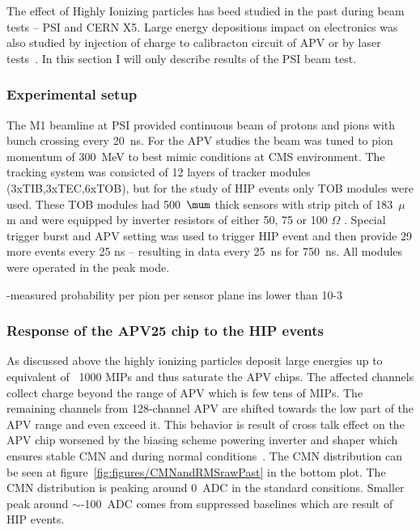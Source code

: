 The effect of Highly Ionizing particles has beed studied in the past during beam tests -- PSI and CERN X5. Large energy depositions impact on electronics was also studied by injection of charge to calibracton circuit of APV or by laser tests~\cite{Adam:2005pz}. In this section I will only describe results of the PSI beam test.

\subsubsection{Experimental setup}

The M1 beamline at PSI provided continuous beam of protons and pions with bunch crossing every 20~ns. For the APV studies the beam was tuned to pion momentum of 300~MeV to best mimic conditions at CMS environment. The tracking system was consicted of 12 layers of tracker modules (3xTIB,3xTEC,6xTOB), but for the study of HIP events only TOB modules were used. These TOB modules had 500~$\mum$ thick sensors with strip pitch of 183~$\mu$m and were equipped by inverter resistors of either 50, 75 or 100 $\Omega$ . Special trigger burst and APV setting was used to trigger HIP event and then provide 29 more events every 25 ns -- resulting in data every 25~ns for 750~ns. All modules were operated in the peak mode. 


-measured probability per pion per sensor plane ins lower than 10-3


\subsubsection{Response of the APV25 chip to the HIP events}

As discussed above the highly ionizing particles deposit large energies up to equivalent of ~1000 MIPs and thus saturate the APV chips. The affected channels collect charge beyond the range of APV which is few tens of MIPs. The remaining channels from 128-channel APV are shifted towards the low part of the APV range and even exceed it. This behavior is result of cross talk effect on the APV chip worsened by the biasing scheme powering inverter and shaper which ensures stable CMN and during normal conditions~\cite{Bainbridge:2004jc}. The CMN distribution can be seen at figure~\ref{fig:figures/CMNandRMSrawPast} in the bottom plot. The CMN distribution is peaking around 0~ADC in the standard consitions. Smaller peak around $\sim$-100~ADC comes from suppressed baselines which are result of HIP events. 

